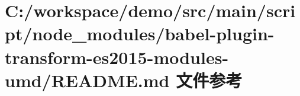 \hypertarget{node__modules_2babel-plugin-transform-es2015-modules-umd_2_r_e_a_d_m_e_8md}{}\section{C\+:/workspace/demo/src/main/script/node\+\_\+modules/babel-\/plugin-\/transform-\/es2015-\/modules-\/umd/\+R\+E\+A\+D\+ME.md 文件参考}
\label{node__modules_2babel-plugin-transform-es2015-modules-umd_2_r_e_a_d_m_e_8md}

